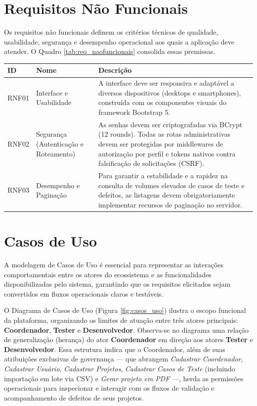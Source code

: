 \section{Requisitos Não Funcionais}

Os requisitos não funcionais definem os critérios técnicos de qualidade, usabilidade, segurança e desempenho operacional aos quais a aplicação deve atender. O Quadro \ref{tab:req_naofuncionais} consolida essas premissas.

\begin{quadro}[H]
\centering
\caption{Requisitos Não Funcionais (RNF) do Test-Manager.}
\label{tab:req_naofuncionais}
\small
\begin{tabularx}{\textwidth}{|l|p{3.8cm}|X|}
\hline
\textbf{ID} & \textbf{Nome} & \textbf{Descrição} \\ \hline
RNF01 & Interface e Usabilidade & A interface deve ser responsiva e adaptável a diversos dispositivos (desktops e smartphones), construída com os componentes visuais do framework Bootstrap 5. \\ \hline
RNF02 & Segurança (Autenticação e Roteamento) & As senhas devem ser criptografadas via BCrypt (12 rounds). Todas as rotas administrativas devem ser protegidas por middlewares de autorização por perfil e tokens nativos contra falsificação de solicitações (CSRF). \\ \hline
RNF03 & Desempenho e Paginação & Para garantir a estabilidade e a rapidez na consulta de volumes elevados de casos de teste e defeitos, as listagens devem obrigatoriamente implementar recursos de paginação no servidor. \\ \hline
\end{tabularx}
\end{quadro}

\section{Casos de Uso}

A modelagem de Casos de Uso é essencial para representar as interações comportamentais entre os atores do ecossistema e as funcionalidades disponibilizadas pelo sistema, garantindo que os requisitos elicitados sejam convertidos em fluxos operacionais claros e testáveis.

O Diagrama de Casos de Uso (Figura \ref{fig:casos_uso}) ilustra o escopo funcional da plataforma, organizando os limites de atuação entre três atores principais: \textbf{Coordenador}, \textbf{Tester} e \textbf{Desenvolvedor}. Observa-se no diagrama uma relação de generalização (herança) do ator \textbf{Coordenador} em direção aos atores \textbf{Tester} e \textbf{Desenvolvedor}. Essa estrutura indica que o Coordenador, além de suas atribuições exclusivas de governança --- que abrangem \textit{Cadastrar Coordenador}, \textit{Cadastrar Usuário}, \textit{Cadastrar Projetos}, \textit{Cadastrar Casos de Teste} (incluindo importação em lote via CSV) e \textit{Gerar projeto em PDF} ---, herda as permissões operacionais para inspecionar e interagir com os fluxos de validação e acompanhamento de defeitos de seus projetos.

